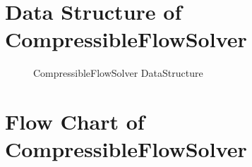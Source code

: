 \section{Data Structure of CompressibleFlowSolver}
   \begin{figure}
          \caption{CompressibleFlowSolver DataStructure}
        \centering
        \begin{turn}{90}
        
        \end{turn}
    \end{figure}

\clearpage
\section{Flow Chart of CompressibleFlowSolver}
    
